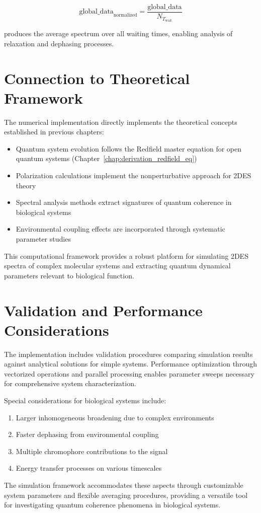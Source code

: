 \begin{equation}
	\label{eq:global_normalization}
	\text{global\_data}_{\text{normalized}} = \frac{\text{global\_data}}{N_{T_{\text{wait}}}}
\end{equation}

\noindent
produces the average spectrum over all waiting times, enabling analysis of relaxation and dephasing processes.

\section{Connection to Theoretical Framework}
\label{sec:connection_to_theory}

\noindent
The numerical implementation directly implements the theoretical concepts established in previous chapters:

\begin{itemize}
	\item Quantum system evolution follows the Redfield master equation for open quantum systems (Chapter~\ref{chap:derivation_redfield_eq})
	\item Polarization calculations implement the nonperturbative approach for 2DES theory
	\item Spectral analysis methods extract signatures of quantum coherence in biological systems
	\item Environmental coupling effects are incorporated through systematic parameter studies
\end{itemize}

\noindent
This computational framework provides a robust platform for simulating 2DES spectra of complex molecular systems and extracting quantum dynamical parameters relevant to biological function.

\section{Validation and Performance Considerations}
\label{sec:validation_performance}

\noindent
The implementation includes validation procedures comparing simulation results against analytical solutions for simple systems. Performance optimization through vectorized operations and parallel processing enables parameter sweeps necessary for comprehensive system characterization.

\noindent
Special considerations for biological systems include:

\begin{enumerate}
	\item Larger inhomogeneous broadening due to complex environments
	\item Faster dephasing from environmental coupling
	\item Multiple chromophore contributions to the signal
	\item Energy transfer processes on various timescales
\end{enumerate}

\noindent
The simulation framework accommodates these aspects through customizable system parameters and flexible averaging procedures, providing a versatile tool for investigating quantum coherence phenomena in biological systems.